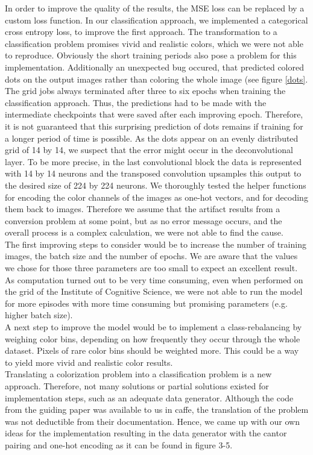 \documentclass[12pt,letterpaper]{article}
\begin{document}
In order to improve the quality of the results, the MSE loss can be replaced by a custom loss function. In our classification approach, we implemented a categorical cross entropy loss, to improve the first approach. The transformation to a classification problem promises vivid and realistic colors, which we were not able to reproduce. Obviously the short training periods also pose a problem for this implementation. Additionally an unexpected bug occured, that predicted colored dots on the output images rather than coloring the whole image (see figure \ref{dots}. The grid jobs always terminated after three to six epochs when training the classification approach. Thus, the predictions had to be made with the intermediate checkpoints that were saved after each improving epoch. Therefore, it is not guaranteed that this surprising prediction of dots remains if training for a longer period of time is possible. As the dots appear on an evenly distributed grid of 14 by 14, we suspect that the error might occur in the deconvolutional layer. To be more precise, in the last convolutional block the data is represented with 14 by 14 neurons and the transposed convolution upsamples this output to the desired size of 224 by 224 neurons. We thoroughly tested the helper functions for encoding the color channels of the images as one-hot vectors, and for decoding them back to images. Therefore we assume that the artifact results from a conversion problem at some point, but as no error message occurs, and the overall process is a complex calculation, we were not able to find the cause.\\
The first improving steps to consider would be to increase the number of training images, the batch size and the number of epochs. We are aware that the values we chose for those three parameters are too small to expect an excellent result. As computation turned out to be very time consuming, even when performed on the grid of the Institute of Cognitive Science, we were not able to run the model for more episodes with more time consuming but promising parameters (e.g. higher batch size).\\
A next step to improve the model would be to implement a class-rebalancing by weighing color bins, depending on how frequently they occur through the whole dataset. Pixels of rare color bins should be weighted more. This could be a way to yield more vivid and realistic color results.\\
Translating a colorization problem into a classification problem is a new approach. Therefore, not many solutions or partial solutions existed for implementation steps, such as an adequate data generator. Although the code from the guiding paper was available to us in caffe, the translation of the problem was not deductible from their documentation. Hence, we came up with our own ideas for the implementation resulting in the data generator with the cantor pairing and one-hot encoding as it can be found in figure 3-5.\\
\end{document}
